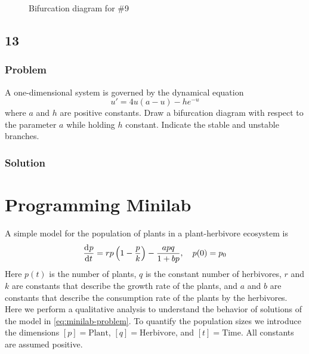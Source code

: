 \documentclass[12pt]{article}
\begin{document}
\begin{figure}
  \centering
  \caption{Bifurcation diagram for \#9}
  \label{fig:9-bifurcation-diagram}
\end{figure}

\subsection{13}
\subsubsection*{Problem}
A one-dimensional system is governed by the dynamical equation
\begin{equation}
  \label{eq:13-problem}
  u'=4u(a-u)-he^{-u}
\end{equation}
where $a$ and $h$ are positive constants. Draw a bifurcation diagram with
respect to the parameter $a$ while holding $h$ constant. Indicate the stable and
unstable branches.

\subsubsection*{Solution}
\todo[]

\newpage
\section{Programming Minilab}
A simple model for the population of plants in a plant-herbivore ecosystem is
\begin{equation}
  \label{eq:minilab-problem}
  \frac{\mathrm{d}^{} {p}}{\mathrm{d}{t}^{}} = rp\left( 1-\frac{p}{k} \right) - \frac{apq}{1+bp}, \quad p(0)=p_0
\end{equation}
Here $p(t)$ is the number of plants, $q$ is the constant number of herbivores,
$r$ and $k$ are constants that describe the growth rate of the plants, and $a$
and $b$ are constants that describe the consumption rate of the plants by the
herbivores. Here we perform a qualitative analysis to understand the behavior of
solutions of the model in \cref{eq:minilab-problem}. To quantify the population
sizes we introduce the dimensions $[p] = \text{Plant}$, $[q] =
\text{Herbivore}$, and $[t] = \text{Time}$. All constants are assumed positive.
\end{document}
